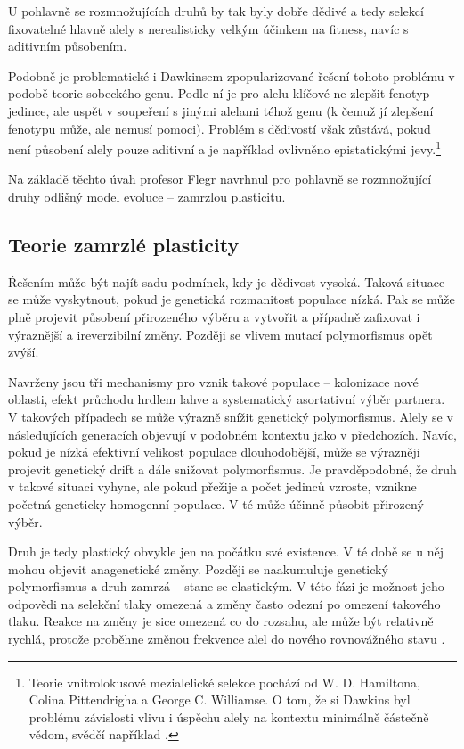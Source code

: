 U pohlavně se rozmnožujících druhů by tak byly dobře dědivé a tedy selekcí fixovatelné hlavně alely s nerealisticky
velkým účinkem na fitness, navíc s aditivním působením.

Podobně je problematické i Dawkinsem zpopularizované řešení tohoto problému v podobě teorie sobeckého genu.
Podle ní je pro alelu klíčové ne zlepšit fenotyp jedince, ale uspět v soupeření s jinými alelami téhož genu
(k čemuž jí zlepšení fenotypu může, ale nemusí pomoci). Problém s dědivostí však zůstává, pokud není působení
alely pouze aditivní a je například ovlivněno epistatickými jevy.\footnote{
Teorie vnitrolokusové mezialelické selekce pochází od W. D. Hamiltona, Colina Pittendrigha a George C. Williamse.
O tom, že si Dawkins byl problému závislosti vlivu i úspěchu alely na kontextu minimálně částečně vědom,
svědčí například \citet[str. 231]{dawkins2003}.
}

Na základě těchto úvah profesor Flegr navrhnul pro pohlavně se rozmnožující druhy odlišný model evoluce -- zamrzlou
plasticitu.

\subsection{Teorie zamrzlé plasticity}

Řešením může být najít sadu podmínek, kdy je dědivost vysoká. Taková situace se může vyskytnout, pokud je genetická
rozmanitost populace nízká. Pak se může plně projevit působení přirozeného výběru a vytvořit a případně zafixovat i
výraznější a ireverzibilní změny. Později se vlivem mutací polymorfismus opět zvýší.

Navrženy jsou tři mechanismy pro vznik takové populace -- kolonizace nové oblasti, efekt průchodu hrdlem lahve a
systematický asortativní výběr partnera. V takových případech se může výrazně snížit genetický polymorfismus. Alely
se v následujících generacích objevují v podobném kontextu jako v předchozích. Navíc, pokud je nízká efektivní
velikost populace dlouhodobější, může se výrazněji projevit genetický drift a dále snižovat polymorfismus. Je
pravděpodobné, že druh v takové situaci vyhyne, ale pokud přežije a počet jedinců vzroste, vznikne početná geneticky
homogenní populace. V té může účinně působit přirozený výběr.

Druh je tedy plastický obvykle jen na počátku své existence. V té době se u něj mohou objevit anagenetické změny.
Později se naakumuluje genetický polymorfismus a druh zamrzá -- stane se elastickým. V této fázi je možnost jeho
odpovědi na selekční tlaky omezená a změny často odezní po omezení takového tlaku. Reakce na změny je sice omezená
co do rozsahu, ale může být relativně rychlá, protože proběhne změnou frekvence alel do nového rovnovážného stavu
\citep[str. 194]{flegr2016}.

